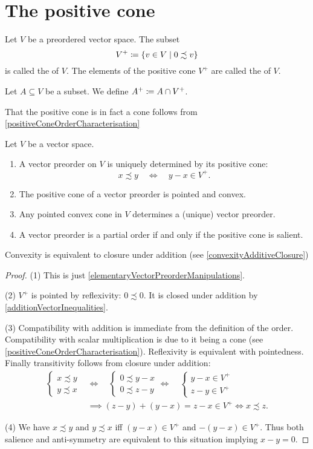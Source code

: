 \section{The positive cone}
\begin{definition}
Let $V$ be a preordered vector space. The subset
\[ V^+ \defeq \setbuilder{v\in V}{0 \precsim v} \]
is called the  of $V$. The elements of the positive cone $V^+$ are called the  of $V$.

Let $A\subseteq V$ be a subset. We define $A^+ \coloneqq A\cap V^+$.
\end{definition}
That the positive cone is in fact a cone follows from \ref{positiveConeOrderCharacterisation}
\begin{proposition} \label{positiveCone}
Let $V$ be a vector space.
\begin{enumerate}
\item A vector preorder on $V$ is uniquely determined by its positive cone:
\[ x \precsim y \quad\iff\quad y-x \in V^+. \]
\item The positive cone of a vector preorder is pointed and convex.
\item Any pointed convex cone in $V$ determines a (unique) vector preorder.
\item A vector preorder is a partial order \textup{if and only if} the positive cone is salient.
\end{enumerate}
\end{proposition}
Convexity is equivalent to closure under addition (see \ref{convexityAdditiveClosure})
\begin{proof}
(1) This is just \ref{elementaryVectorPreorderManipulations}.

(2) $V^+$  is pointed by reflexivity: $0\precsim 0$. It is closed under addition by \ref{additionVectorInequalities}.

(3) Compatibility with addition is immediate from the definition of the order. Compatibility with scalar multiplication is due to it being a cone (see \ref{positiveConeOrderCharacterisation}). Reflexivity is equivalent with pointedness. Finally transitivity follows from closure under addition:
\begin{align*}
 \begin{cases}
x\precsim y \\ y\precsim x
\end{cases} &\iff \quad \begin{cases}
0 \precsim y -x \\ 0 \precsim z-y
\end{cases} \iff\quad \begin{cases}
y-x \in V^+ \\ z-y \in V^+
\end{cases} \\
&\implies (z-y)+(y-x) = z-x \in V^+ \iff x \precsim z. 
\end{align*}

(4) We have $x\precsim y$ and $y\precsim x$ iff $(y-x) \in V^+$ and $-(y-x) \in V^+$. Thus both salience and anti-symmetry are equivalent to this situation implying $x-y = 0$.
\end{proof}

